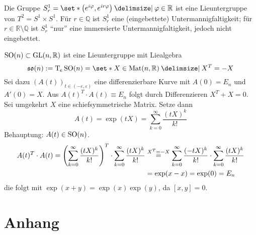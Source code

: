 Die Gruppe $S^1_r = \set*{\enbrace*{e^{i \varphi}, e^{i r \varphi}} \given \varphi \in \mathbb{R}}$ ist eine Lieuntergruppe von $T^2=S^1 \times S^1$.
Für $r \in \mathbb{Q}$ ist $S^1_r$ eine (eingebettete) Untermannigfaltigkeit; für $r \in \mathbb{R}\setminus \mathbb{Q}$ ist $S^1_r$ \enquote{nur} eine immersierte Untermannigfaltigkeit, jedoch nicht eingebettet.

$\SO(n) \subset \GL(n,\mathbb{R})$ ist eine Lieuntergruppe mit Liealgebra 
\[
	\mathfrak{so}(n) := \Tmap_e \SO(n) = \set*{X \in \Mat(n,\mathbb{R}) \given X^T=-X}
\]
Sei dazu $(A(t))_{t \in (-\varepsilon,\varepsilon)}$ eine differenzierbare Kurve mit $A(0)=E_n$ und $A'(0)=X$.
Aus $A(t)^T \cdot A(t) \equiv E_n$ folgt durch Differenzieren $X^T + X =0$.
Sei umgekehrt $X$ eine schiefsymmetrische Matrix.
Setze dann 
\[
	A(t) =\exp(t X) = \sum_{k=0}^{\infty} \frac{(tX)^k}{k!} 
\]
Behauptung: $A(t) \in \SO(n)$.
\begin{align}
	A(t)^T \cdot A(t) = \enbrace*{\sum_{k=0}^{\infty} \frac{(tX)^k}{k!} }^T \cdot \sum_{k=0}^{\infty} \frac{(tX)^k}{k!} &\stackrel{X^T=-X}{= }\sum_{k=0}^{\infty} \frac{(-tX)^k}{k!}  \cdot \sum_{k=0}^{\infty} \frac{(tX)^k}{k!} \\
	&= \exp(x-x) = \exp(0) =E_n
\end{align}
die folgt mit $\exp(x+y)= \exp(x) \exp(y)$, da $[x,y]=0$.

\cleardoubleoddemptypage
{}
\setcounter{page}{1}
\cleardoubleoddemptypage
\appendix

\chapter{Anhang} %
\label{sec:anhang}

\printindex
\printbibliography
\listoffigures
\todototoc
{}

